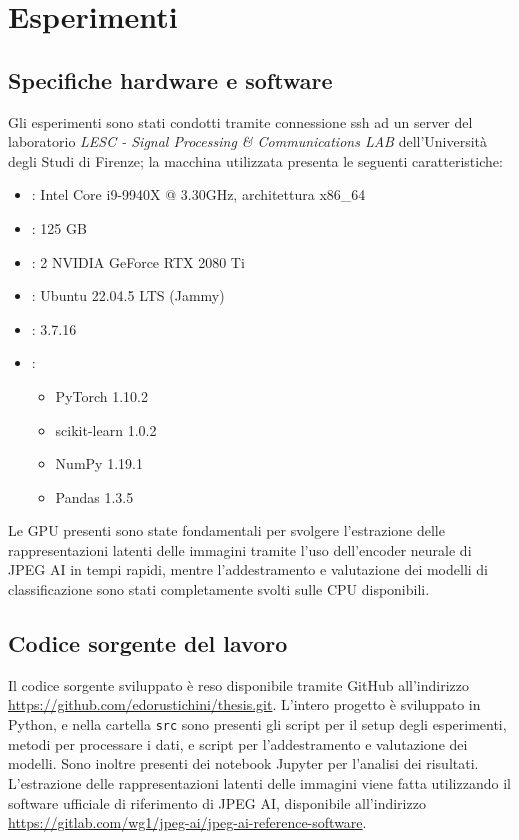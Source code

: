 \chapter{Esperimenti}\label{ch:exp}
\section{Specifiche hardware e software}
Gli esperimenti sono stati condotti tramite connessione ssh ad un server del laboratorio \textit{LESC - Signal Processing \& Communications LAB} dell'Università degli Studi di Firenze; la macchina utilizzata presenta le seguenti caratteristiche:
\begin{itemize}
    \item {}: Intel Core i9-9940X @ 3.30GHz, architettura x86\_64
    \item {}: 125 GB
    \item {}: 2 NVIDIA GeForce RTX 2080 Ti
    \item {}: Ubuntu 22.04.5 LTS (Jammy)
    \item {}: 3.7.16
    \item {}:
    \begin{itemize}
        \item PyTorch 1.10.2
        \item scikit-learn 1.0.2  
        \item NumPy 1.19.1
        \item Pandas 1.3.5
    \end{itemize}
\end{itemize}
Le GPU presenti sono state fondamentali per svolgere l'estrazione delle rappresentazioni latenti delle immagini tramite l'uso dell'encoder neurale di JPEG AI in tempi rapidi, mentre l'addestramento e valutazione dei modelli di classificazione sono stati completamente svolti sulle CPU disponibili.
\section{Codice sorgente del lavoro}
Il codice sorgente sviluppato è reso disponibile tramite GitHub all'indirizzo \url{https://github.com/edorustichini/thesis.git}. L'intero progetto è sviluppato in Python, e nella cartella \texttt{src} sono presenti gli script per il setup degli esperimenti, metodi per processare i dati, e script per l'addestramento e valutazione dei modelli. Sono inoltre presenti dei notebook Jupyter per l'analisi dei risultati.\\
L'estrazione delle rappresentazioni latenti delle immagini viene fatta utilizzando il software  ufficiale di riferimento di JPEG AI, disponibile all'indirizzo \url{https://gitlab.com/wg1/jpeg-ai/jpeg-ai-reference-software}.
